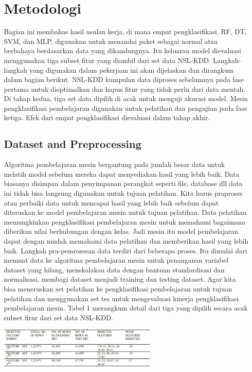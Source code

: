 \documentclass[conference]{IEEEtran}
\begin{document}
\section{Metodologi}

Bagian ini membahas hasil usulan kerja, di mana empat pengklasifikasi, RF, DT, SVM, dan MLP, digunakan untuk menandai paket sebagai normal atau berbahaya berdasarkan data yang dikandungnya. Itu keluaran model dievaluasi menggunakan tiga subset fitur yang diambil dari set data NSL-KDD. Langkah-langkah yang digunakan dalam pekerjaan ini akan dijelaskan dan dirangkum dalam bagian berikut. NSL-KDD kumpulan data diproses sebelumnya pada fase pertama untuk dioptimalkan dan hapus fitur yang tidak perlu dari data mentah. Di tahap kedua, tiga set data dipilih di acak untuk menguji akurasi model. Mesin pengklasifikasi pembelajaran digunakan untuk pelatihan dan pengujian pada fase ketiga. Efek dari empat pengklasifikasi dievaluasi dalam tahap akhir.
\subsection{Dataset and Preprocessing}
Algoritma pembelajaran mesin bergantung pada jumlah besar data untuk melatih model sebelum mereka dapat menyediakan hasil yang lebih baik. Data biasanya disimpan dalam penyimpanan perangkat seperti file, database dll data ini tidak bisa langsung digunakan untuk tujuan pelatihan. Kita harus praproses atau perbaiki data untuk mencapai hasil yang lebih baik sebelum dapat diteruskan ke model pembelajaran mesin untuk tujuan pelatihan. Data pelatihan memungkinkan pengklasifikasi pembelajaran mesin untuk memahami bagaimana diberikan nilai berhubungan dengan kelas. Jadi mesin itu model pembelajaran dapat dengan mudah memahami data pelatihan dan memberikan hasil yang lebih baik. Langkah pra-pemrosesan data terdiri dari beberapa proses. Itu dimulai dari memuat data ke algoritma pembelajaran mesin untuk penanganan variabel dataset yang hilang, menskalakan data dengan bantuan standardisasi dan normalisasi, membagi dataset menjadi training dan testing dataset. Agar kita bisa meneruskan set pelatihan ke pengklasifikasi pembelajaran untuk tujuan pelatihan dan menggunakan set tes untuk mengevaluasi kinerja pengklasifikasi pembelajaran mesin. Tabel 1 merangkum detail dari tiga yang dipilih secara acak subset fitur dari set data NSL-KDD.

\begin{minipage}{\linewidth}
\centerline{\includegraphics[width=80mm]{Gambar/gambar1.JPG}}
\label{fig2}
\end{minipage}
\end{document}
